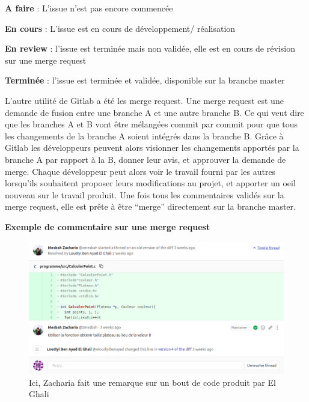 \textbf{A faire} : L'issue n'est pas encore commencée

\textbf{En cours} : L'issue est en cours de développement/ réalisation

\textbf{En review} : l'issue est terminée mais non validée, elle est en cours de révision sur une merge request

\textbf{Terminée} : l'issue est terminée et validée, disponible sur la branche master

	L’autre utilité de Gitlab a été les merge request. Une merge request est une demande de fusion entre une branche A et une autre branche B. Ce qui veut dire que les branches A et B vont être mélangées commit par commit pour que tous les changements de la branche A soient intégrés dans la branche B.
Grâce à Gitlab les développeurs peuvent alors visionner les changements apportés par la branche A par rapport à la B, donner leur avis, et approuver la demande de merge.
Chaque développeur peut alors voir le travail fourni par les autres lorsqu’ils souhaitent proposer leurs modifications au projet, et apporter un oeil nouveau sur le travail produit. Une fois tous les commentaires validés sur la merge request, elle est prête à être “merge” directement sur la branche master.

\begin{center}
\textbf{Exemple de commentaire sur une merge request}
\end{center}
\begin{figure}[h]
  \includegraphics[width=18cm]{./sourcesIMAGES/exempleMergeRequest.png}
  \caption{Ici, Zacharia fait une remarque sur un bout de code produit par El Ghali}
\end{figure}
